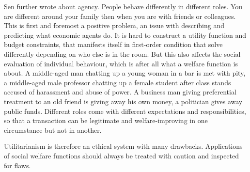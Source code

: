 Sen further wrote about agency. People behave differently in different roles. You are different around your family then when you are with friends or colleagues. This is first and foremost a positive problem, an issue with describing and predicting what economic agents do. It is hard to construct a utility function and budget constraints, that manifests itself in first-order condition that solve differently depending on who else is in the room. But this also affects the social evaluation of individual behaviour, which is after all what a welfare function is about. A middle-aged man chatting up a young woman in a bar is met with pity, a middle-aged male professor chatting up a female student after class stands accused of harassment and abuse of power. A business man giving preferential treatment to an old friend is giving away his own money, a politician gives away public funds. Different roles come with different expectations and responsibilities, so that a transaction can be legitimate and welfare-improving in one circumstance but not in another.

Utilitarianism is therefore an ethical system with many drawbacks. Applications of social welfare functions should always be treated with caution and inspected for flaws.